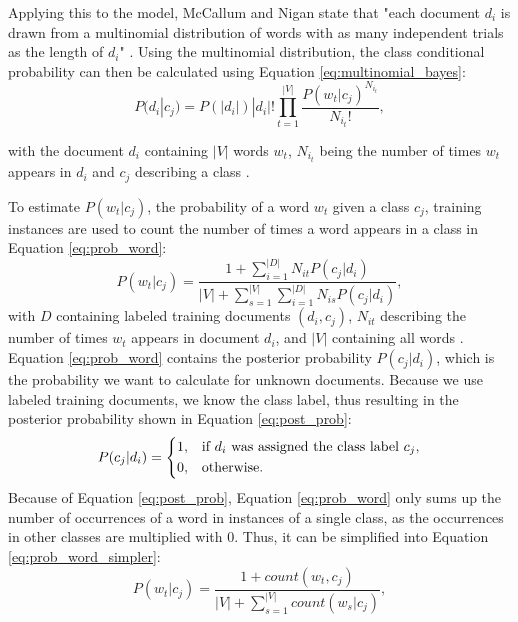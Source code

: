         Applying this to the model, McCallum and Nigan state that "each document $d_i$ is drawn from a multinomial distribution of words with as many independent trials as the length of $d_i$" \cite[p.~3]{Mccallum1998}. Using the multinomial distribution, the class conditional probability can then be calculated using Equation \eqref{eq:multinomial_bayes}:
        \begin{equation}
            \label{eq:multinomial_bayes}
                P(d_i|c_j) = P(|d_i|)|d_i|!\prod_{t=1}^{|V|}\frac{P(w_t|c_j)^{N_{i_t}}}{N_{i_t}!},
        \end{equation}
        
        with the document $d_i$ containing $|V|$ words $w_t$, $N_{i_t}$ being the number of times $w_t$ appears in $d_i$ and $c_j$ describing a class \cite{Mccallum1998}. 
        
        To estimate $P(w_t|c_j)$, the probability of a word $w_t$ given a class $c_j$, training instances are used to count the number of times a word appears in a class in Equation \eqref{eq:prob_word}:
        \begin{equation}
            \label{eq:prob_word}
                P(w_t|c_j) = \frac{1 + \sum_{i=1}^{|D|}N_{it} P(c_j|d_i)}{|V| + \sum_{s=1}^{|V|} \sum_{i=1}^{|D|}N_{is} P (c_j|d_i)}, 
        \end{equation}
        with $D$ containing labeled training documents $(d_i,c_j)$, $N_{it}$ describing the number of times $w_t$ appears in document $d_i$, and $|V|$ containing all words \cite{Mccallum1998}.
        Equation \eqref{eq:prob_word} contains the posterior probability $P(c_j|d_i)$, which is the probability we want to calculate for unknown documents. Because we use labeled training documents, we know the class label, thus resulting in the posterior probability shown in Equation \eqref{eq:post_prob}:
        \begin{equation}
                \label{eq:post_prob}
                P(c_j|d_i)= 
                \begin{dcases}
                1,& \text{if } d_i \text{ was assigned the class label } c_j, \\
                0,              & \text{otherwise.}
        \end{dcases}
        \end{equation}
        Because of Equation \eqref{eq:post_prob}, Equation \eqref{eq:prob_word} only sums up the number of occurrences of a word in instances of a single class, as the occurrences in other classes are multiplied with 0. Thus, it can be simplified into Equation \eqref{eq:prob_word_simpler}:
                \begin{equation}
            \label{eq:prob_word_simpler}
                P(w_t|c_j) = \frac{1 + count(w_t, c_j)}{|V| + \sum_{s=1}^{|V|}count(w_s|c_j)}, 
        \end{equation}


